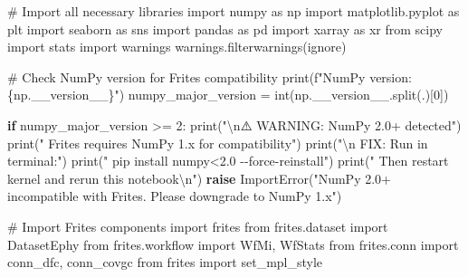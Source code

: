 \documentclass[
  11pt,
  letterpaper,
  oneside,
  openany]{book}
\newenvironment{Shaded}{\begin{snugshade}}{\end{snugshade}}
\newcommand{\BuiltInTok}[1]{\textcolor[rgb]{0.00,0.23,0.31}{#1}}
\newcommand{\CharTok}[1]{\textcolor[rgb]{0.13,0.47,0.30}{#1}}
\newcommand{\CommentTok}[1]{\textcolor[rgb]{0.37,0.37,0.37}{#1}}
\newcommand{\ControlFlowTok}[1]{\textcolor[rgb]{0.00,0.23,0.31}{\textbf{#1}}}
\newcommand{\DecValTok}[1]{\textcolor[rgb]{0.68,0.00,0.00}{#1}}
\newcommand{\ImportTok}[1]{\textcolor[rgb]{0.00,0.46,0.62}{#1}}
\newcommand{\NormalTok}[1]{\textcolor[rgb]{0.00,0.23,0.31}{#1}}
\newcommand{\OperatorTok}[1]{\textcolor[rgb]{0.37,0.37,0.37}{#1}}
\newcommand{\PreprocessorTok}[1]{\textcolor[rgb]{0.68,0.00,0.00}{#1}}
\newcommand{\SpecialCharTok}[1]{\textcolor[rgb]{0.37,0.37,0.37}{#1}}
\newcommand{\SpecialStringTok}[1]{\textcolor[rgb]{0.13,0.47,0.30}{#1}}
\newcommand{\StringTok}[1]{\textcolor[rgb]{0.13,0.47,0.30}{#1}}
\begin{document}
\begin{Shaded}
\begin{Highlighting}[]
\CommentTok{\# Import all necessary libraries}
\ImportTok{import}\NormalTok{ numpy }\ImportTok{as}\NormalTok{ np}
\ImportTok{import}\NormalTok{ matplotlib.pyplot }\ImportTok{as}\NormalTok{ plt}
\ImportTok{import}\NormalTok{ seaborn }\ImportTok{as}\NormalTok{ sns}
\ImportTok{import}\NormalTok{ pandas }\ImportTok{as}\NormalTok{ pd}
\ImportTok{import}\NormalTok{ xarray }\ImportTok{as}\NormalTok{ xr}
\ImportTok{from}\NormalTok{ scipy }\ImportTok{import}\NormalTok{ stats}
\ImportTok{import}\NormalTok{ warnings}
\NormalTok{warnings.filterwarnings(}\StringTok{\textquotesingle{}ignore\textquotesingle{}}\NormalTok{)}

\CommentTok{\# Check NumPy version for Frites compatibility}
\BuiltInTok{print}\NormalTok{(}\SpecialStringTok{f"NumPy version: }\SpecialCharTok{\{}\NormalTok{np}\SpecialCharTok{.}\NormalTok{\_\_version\_\_}\SpecialCharTok{\}}\SpecialStringTok{"}\NormalTok{)}
\NormalTok{numpy\_major\_version }\OperatorTok{=} \BuiltInTok{int}\NormalTok{(np.\_\_version\_\_.split(}\StringTok{\textquotesingle{}.\textquotesingle{}}\NormalTok{)[}\DecValTok{0}\NormalTok{])}

\ControlFlowTok{if}\NormalTok{ numpy\_major\_version }\OperatorTok{\textgreater{}=} \DecValTok{2}\NormalTok{:}
    \BuiltInTok{print}\NormalTok{(}\StringTok{"}\CharTok{\textbackslash{}n}\StringTok{⚠️  WARNING: NumPy 2.0+ detected"}\NormalTok{)}
    \BuiltInTok{print}\NormalTok{(}\StringTok{"   Frites requires NumPy 1.x for compatibility"}\NormalTok{)}
    \BuiltInTok{print}\NormalTok{(}\StringTok{"}\CharTok{\textbackslash{}n}\StringTok{   FIX: Run in terminal:"}\NormalTok{)}
    \BuiltInTok{print}\NormalTok{(}\StringTok{"   pip install \textquotesingle{}numpy\textless{}2.0\textquotesingle{} {-}{-}force{-}reinstall"}\NormalTok{)}
    \BuiltInTok{print}\NormalTok{(}\StringTok{"   Then restart kernel and rerun this notebook}\CharTok{\textbackslash{}n}\StringTok{"}\NormalTok{)}
    \ControlFlowTok{raise} \PreprocessorTok{ImportError}\NormalTok{(}\StringTok{"NumPy 2.0+ incompatible with Frites. Please downgrade to NumPy 1.x"}\NormalTok{)}

\CommentTok{\# Import Frites components}
\ImportTok{import}\NormalTok{ frites}
\ImportTok{from}\NormalTok{ frites.dataset }\ImportTok{import}\NormalTok{ DatasetEphy}
\ImportTok{from}\NormalTok{ frites.workflow }\ImportTok{import}\NormalTok{ WfMi, WfStats}
\ImportTok{from}\NormalTok{ frites.conn }\ImportTok{import}\NormalTok{ conn\_dfc, conn\_covgc}
\ImportTok{from}\NormalTok{ frites }\ImportTok{import}\NormalTok{ set\_mpl\_style}


\end{Highlighting}
\end{Shaded}
\end{document}
